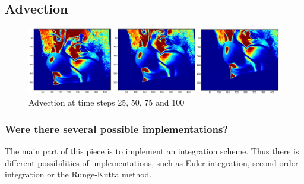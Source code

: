 \documentclass[accepted,single]{gipaper}
\begin{document}







\subsection{Advection}
\begin{center}
\begin{figure}[ht]
\includegraphics[width = \textwidth]{advect2.jpg}
\caption{Advection at time steps 25, 50, 75 and 100}
\label{advect}
\end{figure}
\end{center}
\subsubsection{Were there several possible implementations?}

The main part of this piece is to implement an integration scheme. Thus there is different possibilities of implementations, such as Euler integration, second order integration or the Runge-Kutta method.
\end{document}

